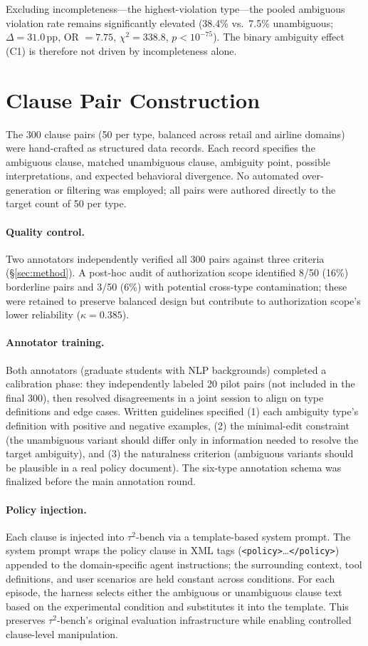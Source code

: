 Excluding incompleteness---the highest-violation type---the pooled ambiguous violation rate remains significantly elevated (38.4\% vs.\ 7.5\% unambiguous; $\Delta = 31.0$\,pp, OR $= 7.75$, $\chi^2 = 338.8$, $p < 10^{-75}$). The binary ambiguity effect (C1) is therefore not driven by incompleteness alone.

\section{Clause Pair Construction}
\label{app:pipeline}

The 300 clause pairs (50 per type, balanced across retail and airline domains) were hand-crafted as structured data records. Each record specifies the ambiguous clause, matched unambiguous clause, ambiguity point, possible interpretations, and expected behavioral divergence. No automated over-generation or filtering was employed; all pairs were authored directly to the target count of 50 per type.

\paragraph{Quality control.} Two annotators independently verified all 300 pairs against three criteria (\S\ref{sec:method}). A post-hoc audit of authorization scope identified 8/50 (16\%) borderline pairs and 3/50 (6\%) with potential cross-type contamination; these were retained to preserve balanced design but contribute to authorization scope's lower reliability ($\kappa = 0.385$).

\paragraph{Annotator training.} Both annotators (graduate students with NLP backgrounds) completed a calibration phase: they independently labeled 20 pilot pairs (not included in the final 300), then resolved disagreements in a joint session to align on type definitions and edge cases. Written guidelines specified (1) each ambiguity type's definition with positive and negative examples, (2) the minimal-edit constraint (the unambiguous variant should differ only in information needed to resolve the target ambiguity), and (3) the naturalness criterion (ambiguous variants should be plausible in a real policy document). The six-type annotation schema was finalized before the main annotation round.

\paragraph{Policy injection.} Each clause is injected into $\tau^2$-bench via a template-based system prompt. The system prompt wraps the policy clause in XML tags (\texttt{<policy>}\ldots\texttt{</policy>}) appended to the domain-specific agent instructions; the surrounding context, tool definitions, and user scenarios are held constant across conditions. For each episode, the harness selects either the ambiguous or unambiguous clause text based on the experimental condition and substitutes it into the template. This preserves $\tau^2$-bench's original evaluation infrastructure while enabling controlled clause-level manipulation.

